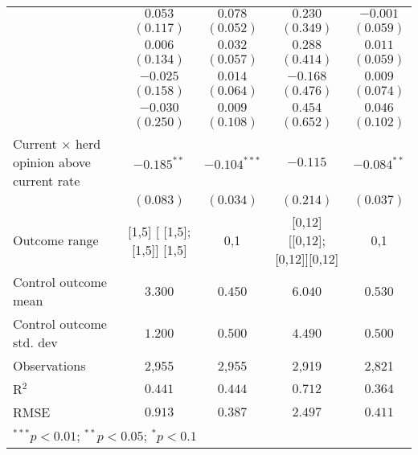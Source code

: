 \begin{table}
\begin{center}
\begin{tabular}{l c c c c}
                                                 & $0.053$                      & $0.078$        & $0.230$                       & $-0.001$       \\
                                                 & $(0.117)$                    & $(0.052)$      & $(0.349)$                     & $(0.059)$      \\
                                                 & $0.006$                      & $0.032$        & $0.288$                       & $0.011$        \\
                                                 & $(0.134)$                    & $(0.057)$      & $(0.414)$                     & $(0.059)$      \\
                                                 & $-0.025$                     & $0.014$        & $-0.168$                      & $0.009$        \\
                                                 & $(0.158)$                    & $(0.064)$      & $(0.476)$                     & $(0.074)$      \\
                                                 & $-0.030$                     & $0.009$        & $0.454$                       & $0.046$        \\
                                                 & $(0.250)$                    & $(0.108)$      & $(0.652)$                     & $(0.102)$      \\
Current $\times$ herd opinion above current rate & $-0.185^{**}$                & $-0.104^{***}$ & $-0.115$                      & $-0.084^{**}$  \\
                                                 & $(0.083)$                    & $(0.034)$      & $(0.214)$                     & $(0.037)$      \\
\hline
Outcome range                                    & [1,5] [ [1,5];  [1,5]] [1,5] & {0,1}          & [0,12] [[0,12]; [0,12]][0,12] & {0,1}          \\
Control outcome mean                             & $3.300$                      & $0.450$        & $6.040$                       & $0.530$        \\
Control outcome std. dev                         & $1.200$                      & $0.500$        & $4.490$                       & $0.500$        \\
Observations                                     & 2,955                        & 2,955          & 2,919                         & 2,821          \\
R$^{2}$                                          & $0.441$                      & $0.444$        & $0.712$                       & $0.364$        \\
RMSE                                             & $0.913$                      & $0.387$        & $2.497$                       & $0.411$        \\
\hline
\multicolumn{5}{l}{\scriptsize{$^{***}p<0.01$; $^{**}p<0.05$; $^{*}p<0.1$}}
\end{tabular}
\caption{}
\label{table:SI_table7_currentherdint}
\end{center}
\end{table}
